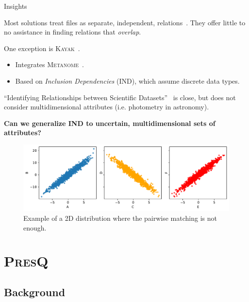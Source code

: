 \documentclass[10pt]{beamer}
\newcommand{\PresQ}[0]{\textsc{PresQ}\xspace}
\begin{document}
\begin{frame}{Insights}
    \begin{block}{}
        Most solutions treat files as separate, independent, relations~\cite{Silva2016}. They offer
        little to no assistance in finding relations that \textit{overlap}.
    \end{block}
    \begin{block}{}
        One exception is \textsc{Kayak}~\cite{maccioni_crossing_2017}.
        \begin{itemize}
            \item Integrates \textsc{Metanome}~\cite{papenbrock2015data}.
            \item Based on \emph{Inclusion Dependencies} (IND), which assume discrete data types.
        \end{itemize}
    \end{block}
    \begin{block}{}
        ``Identifying Relationships between Scientific Datasets''~\cite{alawini2016} is close, but does not
        consider multidimensional attributes (i.e. photometry in astronomy).
    \end{block}
    \alert{\textbf{Can we generalize IND to uncertain, multidimensional sets of attributes?}}
\end{frame}

\begin{frame}{}
\begin{figure}
    \centering
    \includegraphics[width=\textwidth]{no2ind.pdf}
    \caption{Example of a 2D distribution where the pairwise matching is not enough.}
\end{figure}
\end{frame}

\section{\PresQ}

\subsection{Background}
\end{document}

